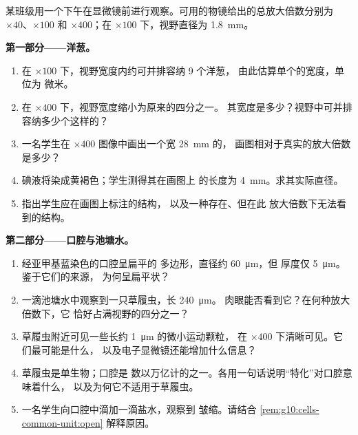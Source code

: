 \begin{problem}
\label{pb:g10:cells-common-unit:1}
某班级用一个下午在显微镜前进行观察。可用的物镜给出的总放大倍数分别为
$\times 40$、$\times 100$ 和
$\times 400$；在 $\times 100$ 下，视野直径为 \qty{1.8}{mm}。

\medskip
\noindent\textbf{第一部分——洋葱。}
\begin{enumerate}
  \item 在 $\times 100$ 下，视野宽度内约可并排容纳 9 个洋葱，
        由此估算单个的宽度，单位为
        微米。
  \item 在 $\times 400$ 下，视野宽度缩小为原来的四分之一。
        其宽度是多少？视野中可并排容纳多少个这样的？
  \item 一名学生在 $\times 400$ 图像中画出一个宽 \qty{28}{mm} 的，
        画图相对于真实的放大倍数
        是多少？
  \item 碘液将染成黄褐色；学生测得其在画图上
        的长度为 \qty{4}{mm}。求其实际直径。
  \item 指出学生应在画图上标注的结构，
        以及一种存在、但在此
        放大倍数下无法看到的结构。
\end{enumerate}

\medskip
\noindent\textbf{第二部分——口腔与池塘水。}
\begin{enumerate}[resume]
  \item 经亚甲基蓝染色的口腔呈扁平的
        多边形，直径约 \qty{60}{\micro m}，但
        厚度仅 \qty{5}{\micro m}。鉴于它们的来源，
        为何呈扁平状？
  \item 一滴池塘水中观察到一只草履虫，长 \qty{240}{\micro m}。
        肉眼能否看到它？在何种放大倍数下，它
        恰好占满视野的四分之一？
  \item 草履虫附近可见一些长约 \qty{1}{\micro m} 的微小运动颗粒，
        在 $\times 400$ 下清晰可见。它们最可能是什么，
        以及电子显微镜还能增加什么信息？
  \item 草履虫是单生物；口腔是
        数以万亿计的之一。各用一句话说明“特化”对口腔意味着什么，
        以及为何它不适用于草履虫。
  \item 一名学生向口腔中滴加一滴盐水，观察到
        皱缩。请结合
        \cref{rem:g10:cells-common-unit:open} 解释原因。
\end{enumerate}


\end{problem}
